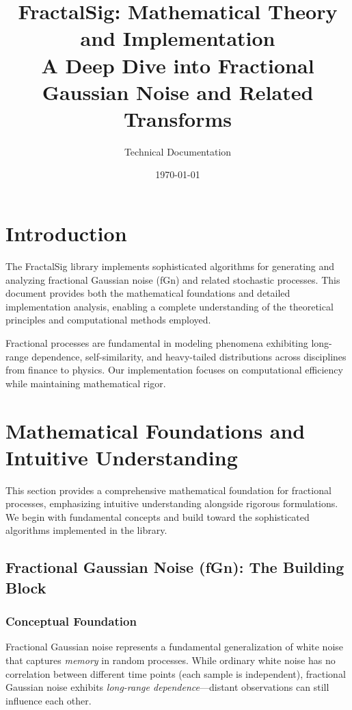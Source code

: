 \documentclass[11pt,a4paper]{article}
\title{FractalSig: Mathematical Theory and Implementation\\
\large A Deep Dive into Fractional Gaussian Noise and Related Transforms}
\author{Technical Documentation}
\date{\today}
\begin{document}
\maketitle

\tableofcontents
\newpage

\section{Introduction}

The FractalSig library implements sophisticated algorithms for generating and analyzing fractional Gaussian noise (fGn) and related stochastic processes. This document provides both the mathematical foundations and detailed implementation analysis, enabling a complete understanding of the theoretical principles and computational methods employed.

Fractional processes are fundamental in modeling phenomena exhibiting long-range dependence, self-similarity, and heavy-tailed distributions across disciplines from finance to physics. Our implementation focuses on computational efficiency while maintaining mathematical rigor.

\section{Mathematical Foundations and Intuitive Understanding}

This section provides a comprehensive mathematical foundation for fractional processes, emphasizing intuitive understanding alongside rigorous formulations. We begin with fundamental concepts and build toward the sophisticated algorithms implemented in the library.

\subsection{Fractional Gaussian Noise (fGn): The Building Block}

\subsubsection{Conceptual Foundation}

Fractional Gaussian noise represents a fundamental generalization of white noise that captures \emph{memory} in random processes. While ordinary white noise has no correlation between different time points (each sample is independent), fractional Gaussian noise exhibits \emph{long-range dependence}—distant observations can still influence each other.
\end{document}
